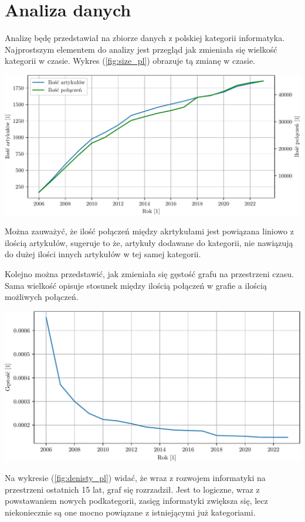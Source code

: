 \documentclass[a4paper, 12pt]{article}
\begin{document}
\section{Analiza danych}
Analizę będę przedstawiał na zbiorze danych z polskiej kategorii informatyka. Najprostszym elementem do analizy jest przegląd jak zmieniała się wielkość kategorii w czasie. Wykres (\ref{fig:size_pl}) obrazuje tą zmianę w czasie.
\begin{center}
    \includegraphics[width=0.90\linewidth]{figures/size_pl.pdf}
    \label{fig:size_pl}
\end{center}
Można zauważyć, że ilość połączeń między akrtykułami jest powiązana liniowo z ilością artykułów, sugeruje to że, artykuły dodawane do kategorii, nie nawiązują do dużej ilości innych artykułów w tej samej kategorii.

Kolejno można przedstawić, jak zmieniała się gęstość grafu na przestrzeni czasu. Sama wielkość opisuje stosunek między ilością połączeń w grafie a ilością możliwych połączeń.
\begin{center}
    \includegraphics[width=0.90\linewidth]{figures/density_pl.pdf}
    \label{fig:denisty_pl}
\end{center}
Na wykresie (\ref{fig:denisty_pl}) widać, że wraz z rozwojem informatyki na przestrzeni ostatnich 15 lat, graf się rozrzadził. Jest to logiczne, wraz z powstawaniem nowych podkategorii, zasięg informatyki zwiększa się, lecz niekoniecznie są one mocno powiązane z istniejącymi już kategoriami.
\end{document}
